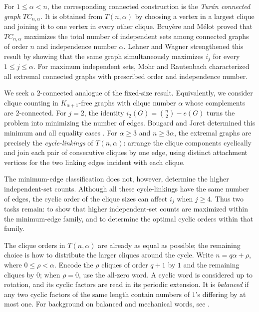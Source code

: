 \documentclass[11pt]{article}
\theoremstyle{definition}
\begin{document}
For $1\le\alpha<n$, the corresponding connected construction is the
\emph{Tur\'an connected graph} $TC_{n,\alpha}$. It is obtained from
$T(n,\alpha)$ by choosing a vertex in a largest clique and joining
it to one vertex in every other clique. Bruy\`ere and M\'elot
\cite{BruyereMelot2009} proved that $TC_{n,\alpha}$ maximizes the
total number of independent sets among connected graphs of order
$n$ and independence number $\alpha$. Lehner and Wagner
\cite[Theorem~2]{LehnerWagner2017} strengthened this result by
showing that the same graph simultaneously maximizes $i_j$ for
every $1\le j\le\alpha$. For maximum independent sets, Mohr and
Rautenbach \cite{MohrRautenbach2021} characterized all extremal
connected graphs with prescribed order and independence number.

We seek a $2$-connected analogue of the fixed-size result.
Equivalently, we consider clique counting in $K_{\alpha+1}$-free
graphs with clique number $\alpha$ whose complements are
$2$-connected. For $j=2$, the identity
$i_2(G)=\binom n2-e(G)$ turns the problem into minimizing the
number of edges. Bougard and Joret determined this minimum and
all equality cases \cite[Proposition~6]{BougardJoret2008}.
For $\alpha\ge3$ and $n\ge3\alpha$, the extremal graphs are
precisely the \emph{cycle-linkings} of $T(n,\alpha)$: arrange the
clique components cyclically and join each pair of consecutive
cliques by one edge, using distinct attachment vertices for the
two linking edges incident with each clique.

The minimum-edge classification does not, however, determine the
higher independent-set counts. Although all these cycle-linkings
have the same number of edges, the cyclic order of the clique sizes
can affect $i_j$ when $j\ge4$. Thus two tasks remain: to show that
higher independent-set counts are maximized within the minimum-edge
family, and to determine the optimal cyclic orders within that
family.

The clique orders in $T(n,\alpha)$ are already as equal as possible;
the remaining choice is how to distribute the larger cliques around
the cycle. Write $n=q\alpha+\rho$, where $0\le\rho<\alpha$.
Encode the $\rho$ cliques of order $q+1$ by $1$ and the remaining
cliques by $0$; when $\rho=0$, use the all-zero word.
A cyclic word is considered up to rotation, and its cyclic factors
are read in its periodic extension. It is \emph{balanced} if any
two cyclic factors of the same length contain numbers of $1$'s
differing by at most one. For background on balanced and mechanical
words, see \cite[Chapter~2]{Lothaire2002}.
\end{document}
